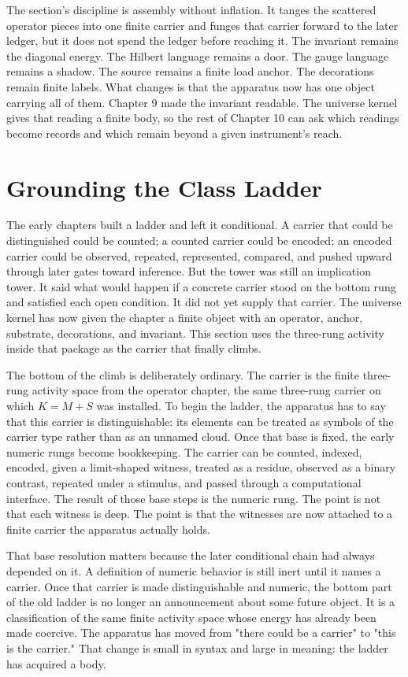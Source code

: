 The section's discipline is assembly without inflation. It tanges the scattered
operator pieces into one finite carrier and funges that carrier forward to the
later ledger, but it does not spend the ledger before reaching it. The invariant
remains the diagonal energy. The Hilbert language remains a door. The gauge
language remains a shadow. The source remains a finite load anchor. The
decorations remain finite labels. What changes is that the apparatus now has one
object carrying all of them. Chapter 9 made the invariant readable. The universe
kernel gives that reading a finite body, so the rest of Chapter 10 can ask which
readings become records and which remain beyond a given instrument's reach.

\section{Grounding the Class Ladder}

The early chapters built a ladder and left it conditional. A carrier that could
be distinguished could be counted; a counted carrier could be encoded; an encoded
carrier could be observed, repeated, represented, compared, and pushed upward
through later gates toward inference. But the tower was still an implication
tower. It said what would happen if a concrete carrier stood on the bottom rung
and satisfied each open condition. It did not yet supply that carrier. The
universe kernel has now given the chapter a finite object with an operator,
anchor, substrate, decorations, and invariant. This section uses the three-rung
activity inside that package as the carrier that finally climbs.

The bottom of the climb is deliberately ordinary. The carrier is the finite
three-rung activity space from the operator chapter, the same three-rung carrier on which
\(K=M+S\) was installed. To begin the ladder, the apparatus has to say that this
carrier is distinguishable: its elements can be treated as symbols of the
carrier type rather than as an unnamed cloud. Once that base is fixed, the early
numeric rungs become bookkeeping. The carrier can be counted, indexed, encoded,
given a limit-shaped witness, treated as a residue, observed as a binary
contrast, repeated under a stimulus, and passed through a computational
interface. The result of those base steps is the numeric rung. The point is not
that each witness is deep. The point is that the witnesses are now attached to a
finite carrier the apparatus actually holds.

That base resolution matters because the later conditional chain had always
depended on it. A definition of numeric behavior is still inert until it names a
carrier. Once that carrier is made distinguishable and numeric, the bottom part of
the old ladder is no longer an announcement about some future object. It is a
classification of the same finite activity space whose energy has already been
made coercive. The apparatus has moved from "there could be a carrier" to "this
is the carrier." That change is small in syntax and large in meaning: the ladder
has acquired a body.

